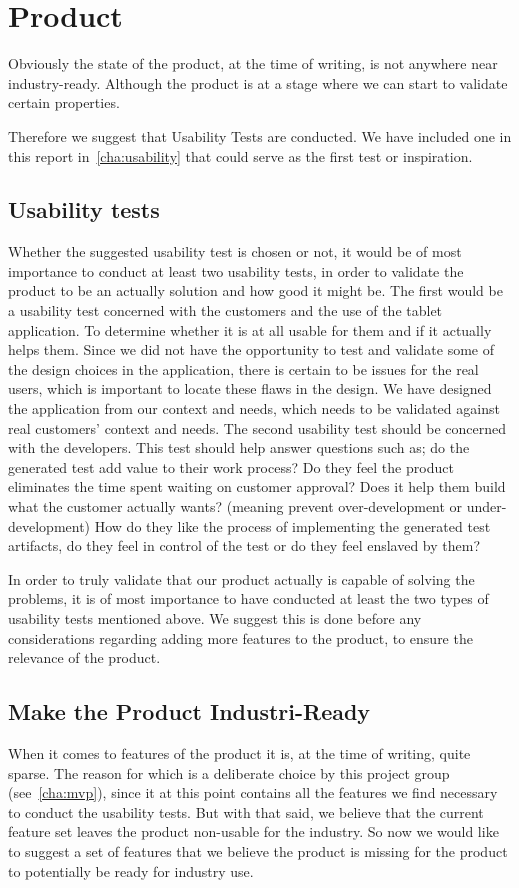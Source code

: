 \section{Product}
Obviously the state of the product, at the time of writing, is not anywhere near industry-ready.
Although the product is at a stage where we can start to validate certain properties.

Therefore we suggest that Usability Tests are conducted.
We have included one in this report in~\autoref{cha:usability} that could serve as the first test or inspiration.

\subsection{Usability tests}
Whether the suggested usability test is chosen or not, it would be of most importance to conduct at least two usability tests, in order to validate the product to be an actually solution and how good it might be.
The first would be a usability test concerned with the customers and the use of the tablet application.
To determine whether it is at all usable for them and if it actually helps them.
Since we did not have the opportunity to test and validate some of the design choices in the application, there is certain to be issues for the real users, which is important to locate these flaws in the design.
We have designed the application from our context and needs, which needs to be validated against real customers' context and needs.
The second usability test should be concerned with the developers.
This test should help answer questions such as; do the generated test add value to their work process? 
Do they feel the product eliminates the time spent waiting on customer approval?
Does it help them build what the customer actually wants? (meaning prevent over-development or under-development)
How do they like the process of implementing the generated test artifacts, do they feel in control of the test or do they feel enslaved by them?

In order to truly validate that our product actually is capable of solving the problems, it is of most importance to have conducted at least the two types of usability tests mentioned above.
We suggest this is done before any considerations regarding adding more features to the product, to ensure the relevance of the product.

\subsection{Make the Product Industri-Ready}
When it comes to features of the product it is, at the time of writing, quite sparse.
The reason for which is a deliberate choice by this project group (see~\autoref{cha:mvp}), since it at this point contains all the features we find necessary to conduct the usability tests.
But with that said, we believe that the current feature set leaves the product non-usable for the industry.
So now we would like to suggest a set of features that we believe the product is missing for the product to potentially be ready for industry use.

